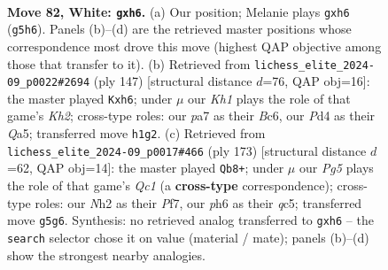 \documentclass[11pt]{article}
\begin{document}
\clearpage

\begin{figure}[p]\centering
\begin{subfigure}{0.46\textwidth}\centering
\resizebox{\linewidth}{!}{%
\newchessgame
\chessboard[
  setfen={5r1r/p2k2p1/7p/q5PP/3P4/4P3/2Q4N/4b2K w - - 5 82},
  showmover=false,
  pgfstyle=straightmove, color=movearrow, markmove={g5-h6}
]}
\caption{}
\end{subfigure}\hfill
\begin{subfigure}{0.46\textwidth}\centering
\resizebox{\linewidth}{!}{%
\newchessgame
\chessboard[
  setfen={8/6pk/2b1p2P/qpP1P1p1/6P1/2R4K/3Q4/8 b - - 0 74},
  showmover=false,
  pgfstyle=straightmove, color=movearrow, markmove={h7-h6}
]}
\caption{}
\end{subfigure}
\\[4pt]
\begin{subfigure}{0.46\textwidth}\centering
\resizebox{\linewidth}{!}{%
\newchessgame
\chessboard[
  setfen={2q3k1/5pp1/1K5p/2Q5/p7/P5P1/1P3R1P/1b6 b - - 44 87},
  showmover=false,
  pgfstyle=straightmove, color=movearrow, markmove={c8-b8}
]}
\caption{}
\end{subfigure}\hfill

\caption{\textbf{Move 82, White: \texttt{gxh6}.} (a) Our position; Melanie plays \texttt{gxh6} (\texttt{g5h6}). Panels (b)--(d) are the retrieved master positions whose correspondence most drove this move (highest QAP objective among those that transfer to it). (b) Retrieved from \texttt{lichess\_elite\_2024-09\_p0022\#2694} (ply 147) [structural distance $d$=76, QAP obj=16]: the master played \texttt{Kxh6}; under $\mu$ our \emph{Kh1} plays the role of that game's \emph{Kh2}; cross-type roles: our \emph{p}a7 as their \emph{B}c6, our \emph{P}d4 as their \emph{Q}a5; transferred move \texttt{h1g2}. (c) Retrieved from \texttt{lichess\_elite\_2024-09\_p0017\#466} (ply 173) [structural distance $d$=62, QAP obj=14]: the master played \texttt{Qb8+}; under $\mu$ our \emph{Pg5} plays the role of that game's \emph{Qc1} (a \textbf{cross-type} correspondence); cross-type roles: our \emph{N}h2 as their \emph{P}f7, our \emph{p}h6 as their \emph{q}c5; transferred move \texttt{g5g6}. Synthesis: no retrieved analog transferred to \texttt{gxh6} -- the \texttt{search} selector chose it on value (material / mate); panels (b)--(d) show the strongest nearby analogies.}
\label{fig:thought-m162}
\end{figure}

\clearpage
\end{document}
